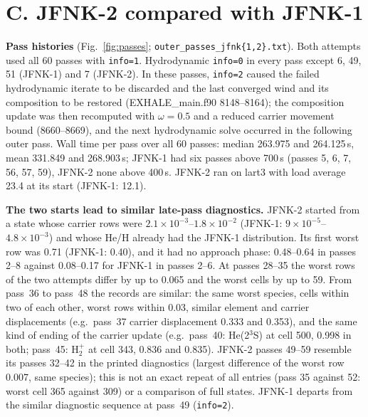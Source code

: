 \documentclass[english,a4paper]{my_memo}
\begin{document}
\section{C. JFNK-2 compared with JFNK-1}\label{sec:c}

\textbf{Pass histories} (Fig.~\ref{fig:passes};
\texttt{outer\_passes\_jfnk\{1,2\}.txt}). Both attempts used all 60 passes
with \texttt{info=1}. Hydrodynamic \texttt{info=0} in every pass except
6, 49, 51 (JFNK-1) and 7 (JFNK-2). In these passes, \texttt{info=2} caused
the failed hydrodynamic iterate to be discarded and the last converged wind
and its composition to be restored (EXHALE\_main.f90 8148--8164); the
composition update was then recomputed with $\omega=0.5$ and a reduced
carrier movement bound (8660--8669), and the next hydrodynamic solve
occurred in the following outer pass. Wall time per pass over all 60
passes: median 263.975 and 264.125\,s, mean 331.849 and 268.903\,s; JFNK-1 had six passes above 700\,s (passes 5, 6, 7, 56, 57, 59),
JFNK-2 none above 400\,s. JFNK-2 ran on lart3 with
load average 23.4 at its start (JFNK-1: 12.1).

\textbf{The two starts lead to similar late-pass diagnostics.} JFNK-2 started from
a state whose carrier rows were $2.1\times10^{-3}$--$1.8\times10^{-2}$
(JFNK-1: $9\times10^{-5}$--$4.8\times10^{-3}$) and whose He/H already had the
JFNK-1 distribution. Its first worst row was 0.71 (JFNK-1: 0.40), and it had
no approach phase: 0.48--0.64 in passes 2--8 against 0.08--0.17 for
JFNK-1 in passes 2--6. At passes 28--35 the worst rows of the two attempts differ by up to
0.065 and the worst cells by up to 59. From pass~36 to pass~48 the
records are similar: the same worst species, cells within two of each
other, worst rows within 0.03, similar element and carrier displacements
(e.g.\ pass~37 carrier displacement 0.333 and 0.353), and the same kind of
ending of the carrier update (e.g.\ pass~40: He(2$^3$S) at cell 500, 0.998
in both; pass~45: H$_2^+$ at cell 343, 0.836 and 0.835). JFNK-2 passes
49--59 resemble its passes 32--42 in the printed diagnostics (largest
difference of the worst row 0.007, same species); this is not an exact
repeat of all entries (pass 35 against 52: worst cell 365 against 309) or a
comparison of full states. JFNK-1 departs from the similar diagnostic
sequence at pass~49 (\texttt{info=2}).
\end{document}
